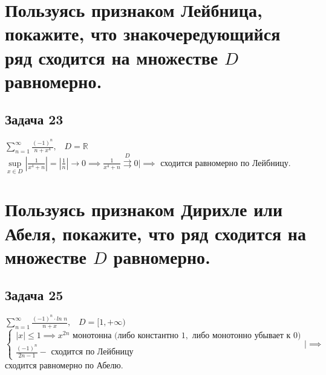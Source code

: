 \documentclass[a4paper, fleqn]{article}
\begin{document}
    
    
    \section*{Пользуясь признаком Лейбница, покажите, что знакочередующийся ряд сходится на множестве $D$
        равномерно.}
    \subsection*{Задача 23}
    $\sum\limits_{n = 1}^{\infty} \frac{(-1)^n}{n + x^4}, \; \; \; D = \mathbb{R}$ \\
    $\sup\limits_{x \in D} \left| \frac{1}{x^4 + n} \right| = \left| \frac{1}{n} \right| \rightarrow 0 \implies \frac{1}{x^4 + n} \stackrel{D}{\rightrightarrows} 0 \bigg| \implies$ сходится равномерно по Лейбницу.\\
   
    
    \section*{Пользуясь признаком Дирихле или Абеля, покажите, что ряд сходится на множестве $D$ равномерно.}
    \subsection*{Задача 25}
    $\sum\limits_{n = 1}^{\infty} \frac{(-1)^n \cdot ln\; n}{n + x}, \; \; \; D = [1, +\infty)$ \\
    $\begin{cases} |x| \leq 1 \implies x^{2n} \text{ монотонна (либо константно }1,\text{ либо монотонно убывает к }0) \\ \frac{(-1)^n}{2n - 1} - \text{ сходится по Лейбницу} \end{cases} \bigg| \implies $ сходится равномерно по Абелю. \\
    
\end{document}
